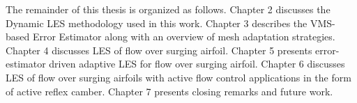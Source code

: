 The remainder of this thesis is organized as follows.
Chapter 2 discusses the Dynamic LES methodology used in this work. 
Chapter 3 describes the VMS-based Error Estimator along with an overview of mesh adaptation strategies.
Chapter 4 discusses LES of flow over surging airfoil.
Chapter 5 presents error-estimator driven adaptive LES for flow over surging airfoil.
Chapter 6 discusses LES of flow over surging airfoils with active flow control applications in the form of active reflex camber.
Chapter 7 presents closing remarks and future work.